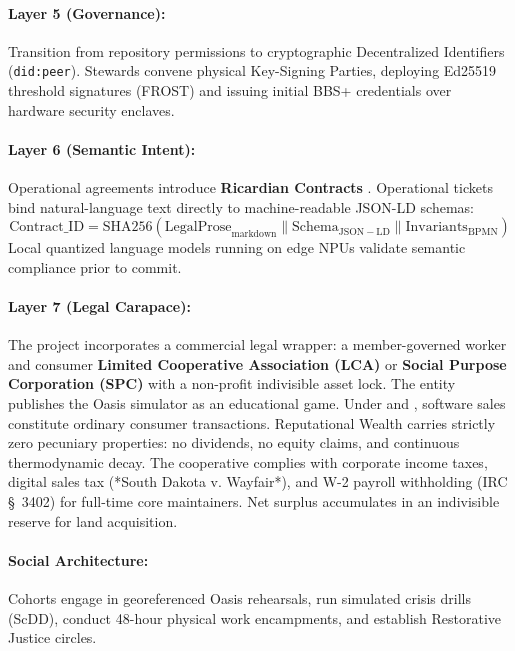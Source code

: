 \paragraph{Layer 5 (Governance):} Transition from repository permissions to cryptographic Decentralized Identifiers (\texttt{did:peer}). Stewards convene physical Key-Signing Parties, deploying Ed25519 threshold signatures (FROST) and issuing initial BBS+ credentials over hardware security enclaves.
\paragraph{Layer 6 (Semantic Intent):} Operational agreements introduce \textbf{Ricardian Contracts} \parencite{grigg2004}. Operational tickets bind natural-language text directly to machine-readable JSON-LD schemas:
\begin{equation}
\mathrm{Contract\_ID} = \mathrm{SHA256}\left(\mathrm{LegalProse}_{\mathrm{markdown}} \parallel \mathrm{Schema}_{\mathrm{JSON-LD}} \parallel \mathrm{Invariants}_{\mathrm{BPMN}}\right)
\label{eq:ricardian_hash}
\end{equation}
Local quantized language models running on edge NPUs validate semantic compliance prior to commit.
\paragraph{Layer 7 (Legal Carapace):} The project incorporates a commercial legal wrapper: a member-governed worker and consumer \textbf{Limited Cooperative Association (LCA)} or \textbf{Social Purpose Corporation (SPC)} with a non-profit indivisible asset lock. The entity publishes the Oasis simulator as an educational game. Under \textcite{howey1946} and \textcite{reves1990}, software sales constitute ordinary consumer transactions. Reputational Wealth carries strictly zero pecuniary properties: no dividends, no equity claims, and continuous thermodynamic decay. The cooperative complies with corporate income taxes, digital sales tax (*South Dakota v. Wayfair*), and W-2 payroll withholding (IRC \S~3402) for full-time core maintainers. Net surplus accumulates in an indivisible reserve for land acquisition.
\paragraph{Social Architecture:} Cohorts engage in georeferenced Oasis rehearsals, run simulated crisis drills (ScDD), conduct 48-hour physical work encampments, and establish Restorative Justice circles.


